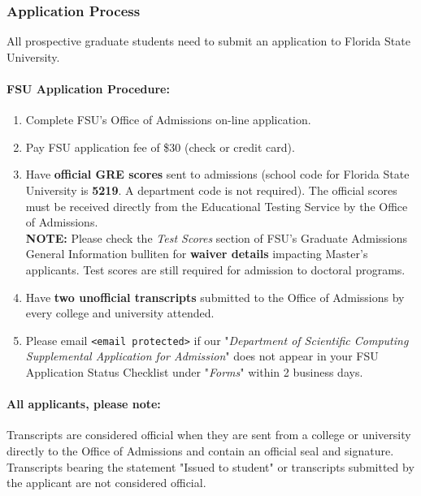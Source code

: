 \documentclass[12pt,a4paper]{article}
\begin{document}
\subsubsection*{Application Process}
All prospective graduate students need to submit an application to Florida State University.

\paragraph{FSU Application Procedure:}
\begin{enumerate}
    \item Complete FSU's Office of Admissions on-line application.
    \item Pay FSU application fee of \$30 (check or credit card).
    \item Have \textbf{official GRE scores} sent to admissions (school code for Florida State University is \textbf{5219}. A department code is not required). The official scores must be received directly from the Educational Testing Service by the Office of Admissions.\\ \textbf{NOTE:} Please check the \textit{Test Scores} section of FSU's Graduate Admissions General Information bulliten for \textbf{waiver details} impacting Master's applicants. Test scores are still required for admission to doctoral programs.
    \item Have \textbf{two unofficial transcripts} submitted to the Office of Admissions by every college and university attended.
    \item Please email \texttt{<email protected>} if our "\textit{Department of Scientific Computing Supplemental Application for Admission}" does not appear in your FSU Application Status Checklist under "\textit{Forms}" within 2 business days.
\end{enumerate}

\paragraph{All applicants, please note:} Transcripts are considered official when they are sent from a college or university directly to the Office of Admissions and contain an official seal and signature. Transcripts bearing the statement "Issued to student" or transcripts submitted by the applicant are not considered official.
\end{document}
